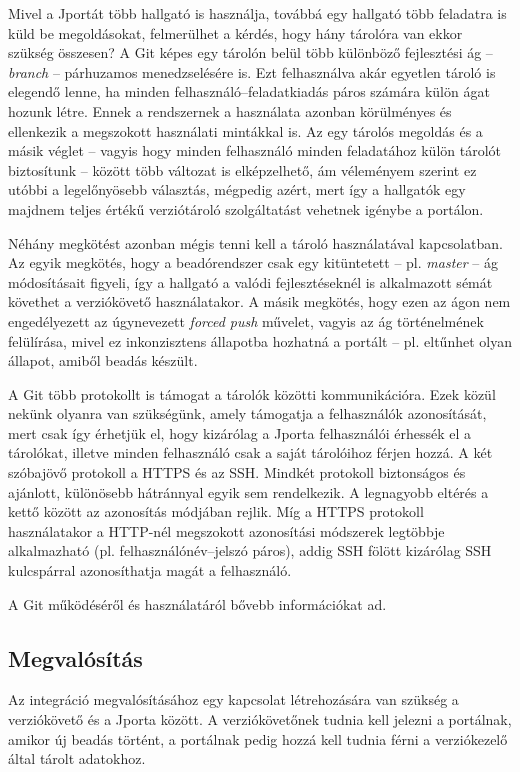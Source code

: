 Mivel a Jportát több hallgató is használja, továbbá egy hallgató több feladatra is küld be megoldásokat, felmerülhet a kérdés, hogy hány tárolóra van ekkor szükség összesen?
A Git képes egy tárolón belül több különböző fejlesztési ág -- \textit{branch} -- párhuzamos menedzselésére is.
Ezt felhasználva akár egyetlen tároló is elegendő lenne, ha minden felhasználó--feladatkiadás páros számára külön ágat hozunk létre.
Ennek a rendszernek a használata azonban körülményes és ellenkezik a megszokott használati mintákkal is.
Az egy tárolós megoldás és a másik véglet -- vagyis hogy minden felhasználó minden feladatához külön tárolót biztosítunk -- között több változat is elképzelhető, ám véleményem szerint ez utóbbi a legelőnyösebb választás, mégpedig azért, mert így a hallgatók egy majdnem teljes értékű verziótároló szolgáltatást vehetnek igénybe a portálon.

Néhány megkötést azonban mégis tenni kell a tároló használatával kapcsolatban.
Az egyik megkötés, hogy a beadórendszer csak egy kitüntetett -- pl. \textit{master} -- ág módosításait figyeli, így a hallgató a valódi fejlesztéseknél is alkalmazott sémát követhet a verziókövető használatakor.
A másik megkötés, hogy ezen az ágon nem engedélyezett az úgynevezett \textit{forced push} művelet, vagyis az ág történelmének felülírása, mivel ez inkonzisztens állapotba hozhatná a portált -- pl. eltűnhet olyan állapot, amiből beadás készült.

A Git több protokollt is támogat a tárolók közötti kommunikációra.
Ezek közül nekünk olyanra van szükségünk, amely támogatja a felhasználók azonosítását, mert csak így érhetjük el, hogy kizárólag a Jporta felhasználói érhessék el a tárolókat, illetve minden felhasználó csak a saját tárolóihoz férjen hozzá.
A két szóbajövő protokoll a HTTPS és az SSH.
Mindkét protokoll biztonságos és ajánlott, különösebb hátránnyal egyik sem rendelkezik.
A legnagyobb eltérés a kettő között az azonosítás módjában rejlik.
Míg a HTTPS protokoll használatakor a HTTP-nél megszokott azonosítási módszerek legtöbbje alkalmazható (pl. felhasználónév--jelszó páros), addig SSH fölött kizárólag SSH kulcspárral azonosíthatja magát a felhasználó.
\cite{ProGit}

A Git működéséről és használatáról bővebb információkat \cite{ProGit} ad. 

\subsection{Megvalósítás}
Az integráció megvalósításához egy kapcsolat létrehozására van szükség a verziókövető és a Jporta között.
A verziókövetőnek tudnia kell jelezni a portálnak, amikor új beadás történt, a portálnak pedig hozzá kell tudnia férni a verziókezelő által tárolt adatokhoz.

